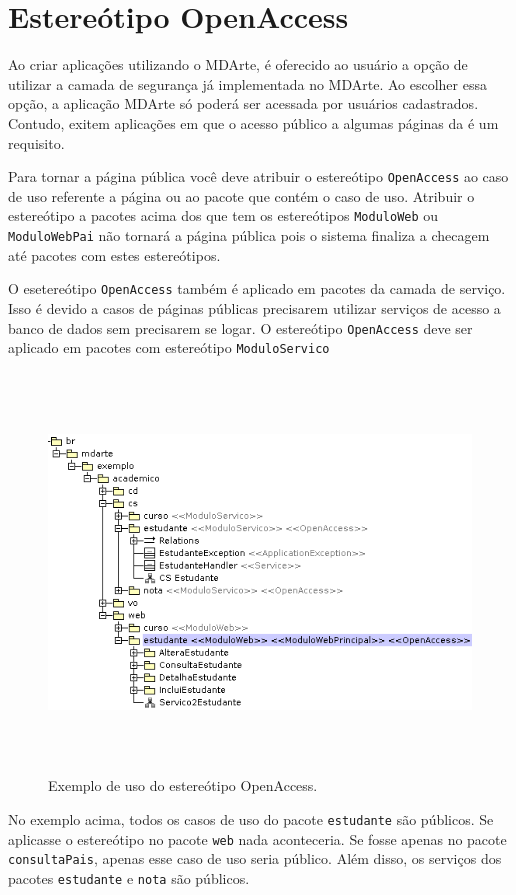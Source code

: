 \section{Estereótipo OpenAccess}

Ao criar aplicações utilizando o MDArte, é oferecido ao usuário a opção de
utilizar a camada de segurança já implementada no MDArte. Ao escolher essa
opção, a aplicação MDArte só poderá ser acessada por usuários cadastrados.
Contudo, exitem aplicações em que o acesso público a algumas páginas da é
um requisito.

Para tornar a página pública você deve atribuir o estereótipo
\texttt{OpenAccess} ao caso de uso referente a página ou ao pacote que contém o caso de uso. Atribuir o
estereótipo a pacotes acima dos que tem os estereótipos \texttt{ModuloWeb} ou
\texttt{ModuloWebPai} não tornará a página pública pois o sistema finaliza a
checagem até pacotes com estes estereótipos.

O esetereótipo \texttt{OpenAccess} também é aplicado em pacotes da camada de
serviço. Isso é devido a casos de páginas públicas precisarem utilizar serviços
de acesso a banco de dados sem precisarem se logar. O estereótipo
\texttt{OpenAccess} deve ser aplicado em pacotes com estereótipo
\texttt{ModuloServico}

\begin{figure}[H]
	\centering
	\includegraphics[width=350pt,height=300pt]{files/imgs/openaccess-00.png}
	\caption{Exemplo de uso do estereótipo OpenAccess.}
	\label{open_access}
\end{figure}

No exemplo acima, todos os casos de uso do pacote \texttt{estudante} são
públicos. Se aplicasse o estereótipo no pacote \texttt{web} nada aconteceria. Se fosse apenas no pacote
\texttt{consultaPais}, apenas esse caso de uso seria público. Além disso, os
serviços dos pacotes \texttt{estudante} e \texttt{nota} são públicos.
